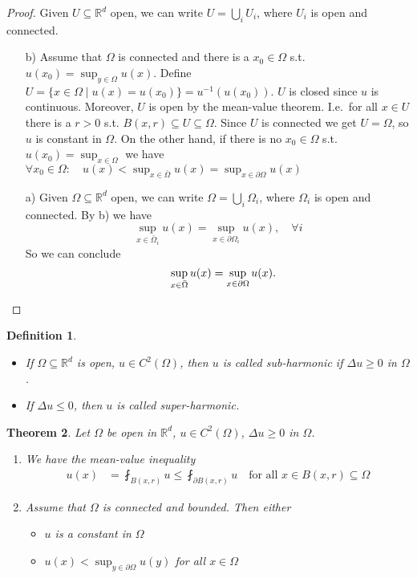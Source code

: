 \documentclass{report}
\theoremstyle{tommy}
\newtheorem{defn}{Definition}
\newtheorem{thm}[defn]{Theorem}
\begin{document}
\begin{proof}
  Given \(U \subseteq \mathbb{R}^d\) open, we can write \(U = \bigcup_i U_i\), where \(U_i\) is open and connected.
  \begin{enumerate}
    \item[b)] Assume that \(\Omega\) is connected and there is a \(x_0 \in \Omega\) s.t. \(u(x_0) = \sup_{y \in \Omega} u(x)\). Define \(U = \{ x \in \Omega \mid u(x) = u(x_0)\} = u^{-1}(u(x_0))\). \(U\) is closed since \(u\) is continuous.
    Moreover, \(U\) is open by the mean-value theorem. I.e.~for all \(x \in U\) there is a \(r > 0\) s.t. \(B(x,r) \subseteq U \subseteq \Omega\).
    Since \(U\) is connected we get \(U = \Omega\), so \(u\) is constant in \(\Omega\). On the other hand, if there is no \(x_0 \in \Omega\) s.t. \(u(x_0) = \sup_{x \in \Omega}\) we have \(\forall x_0 \in \Omega: \quad u(x) < \sup_{x \in \bar \Omega} u(x) = \sup_{x \in \partial \Omega} u(x)\)
    \item[a)] Given \(\Omega \subseteq \mathbb{R}^d\) open, we can write \(\Omega = \bigcup_i \Omega_i\), where \(\Omega_i\) is open and connected. By b) we have
      \[\sup_{x \in \bar \Omega_i} u(x) = \sup_{x \in \partial \Omega_i} u(x), \quad \forall i\]
      So we can conclude
      \[\quad \sup_{x \in \bar \Omega} u(x) = \sup_{x \in \partial \Omega} u(x). \qedhere\]
  \end{enumerate}
\end{proof}

\begin{defn}
  \begin{itemize}
    \item If \(\Omega \subseteq \mathbb{R}^d\) is open, \(u \in C^2(\Omega)\), then \(u\) is called \emph{sub-harmonic} if \(\Delta u \ge 0\) in \(\Omega\).
    \item If \(\Delta u \le 0\), then \(u\) is called \emph{super-harmonic}.
  \end{itemize}
\end{defn}

\begin{thm}
  Let \(\Omega\) be open in \(\mathbb{R}^d\), \(u \in C^2(\Omega)\), \(\Delta u \ge 0\) in \(\Omega\). \begin{enumerate}
    \item We have the mean-value inequality \begin{align*}
      u(x) &= \fint_{B(x, r)} u \le \fint_{\partial B(x, r)} u \quad \text{for all } x \in B(x, r) \subseteq \Omega
    \end{align*}
    \item Assume that \(\Omega\) is connected and bounded. Then either \begin{itemize}
      \item \(u\) is a constant in \(\Omega\)
      \item \(u(x) < \sup_{y \in \partial \Omega} u(y)\) for all \(x \in \Omega\)
    \end{itemize}
  \end{enumerate}
\end{thm}
\end{document}
